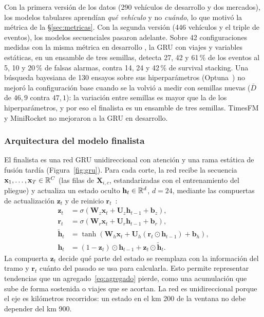 Con la primera versión de los datos (290 vehículos de desarrollo y dos mercados), los modelos tabulares aprendían \emph{qué vehículo} y
no \emph{cuándo}, lo que motivó la métrica de la \S\ref{sec:metricas}. Con la segunda versión (446 vehículos y el triple
de eventos), los modelos secuenciales pasaron adelante. Sobre 42 configuraciones medidas con la misma métrica en
desarrollo \tagdev{}, la GRU con viajes y variables estáticas, en un ensamble de tres semillas, detecta 27, 42 y 61\,\% de
los eventos al 5, 10 y 20\,\% de falsas alarmas, contra 14, 24 y 42\,\% de survival stacking. Una búsqueda bayesiana de
130 ensayos sobre sus hiperparámetros (Optuna~\cite{akiba2019}) no mejoró la configuración base cuando se la volvió a medir
con semillas nuevas ($\bar D$ de $46{,}9$ contra $47{,}1$): la variación entre semillas es mayor que la de los
hiperparámetros, y por eso el finalista es un ensamble de tres semillas. TimesFM y MiniRocket no mejoraron a la GRU en
desarrollo.

\subsubsection{Arquitectura del modelo finalista}
\label{sec:gru}

El finalista es una red GRU unidireccional con atención y una rama estática de fusión tardía (Figura~\ref{fig:gru}). Para
cada corte, la red recibe la secuencia $\mathbf{x}_1,\dots,\mathbf{x}_T \in \mathbb{R}^{C}$ (las filas de $\mathbf{X}_{i,c}$,
estandarizadas con el entrenamiento del pliegue) y actualiza un estado oculto $\mathbf{h}_t \in \mathbb{R}^{d}$, $d = 24$, mediante
las compuertas de actualización $\mathbf{z}_t$ y de reinicio $\mathbf{r}_t$~\cite{cho2014}:
\begin{align}
  \mathbf{z}_t &= \sigma\!\left(\mathbf{W}_z \mathbf{x}_t + \mathbf{U}_z \mathbf{h}_{t-1} + \mathbf{b}_z\right), \label{eq:gru1}\\
  \mathbf{r}_t &= \sigma\!\left(\mathbf{W}_r \mathbf{x}_t + \mathbf{U}_r \mathbf{h}_{t-1} + \mathbf{b}_r\right), \\
  \tilde{\mathbf{h}}_t &= \tanh\!\left(\mathbf{W}_h \mathbf{x}_t + \mathbf{U}_h (\mathbf{r}_t \odot \mathbf{h}_{t-1}) + \mathbf{b}_h\right), \\
  \mathbf{h}_t &= (1 - \mathbf{z}_t) \odot \mathbf{h}_{t-1} + \mathbf{z}_t \odot \tilde{\mathbf{h}}_t. \label{eq:gru4}
\end{align}
La compuerta $\mathbf{z}_t$ decide qué parte del estado se reemplaza con la información del tramo y $\mathbf{r}_t$ cuánto del
pasado se usa para calcularla. Esto permite representar tendencias que un agregado~\eqref{eq:agregado} pierde, como una
acumulación que sube de forma sostenida o viajes que se acortan. La red es unidireccional porque el eje es kilómetros
recorridos: un estado en el km 200 de la ventana no debe depender del km 900.

